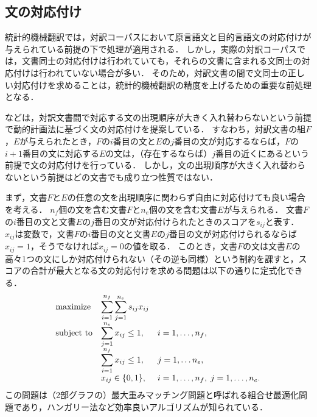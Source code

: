 \documentclass[japanese]{jnlp_1.4}
\begin{document}
\subsection{文の対応付け}
\label{sec:alighnment}

統計的機械翻訳では，対訳コーパスにおいて原言語文と目的言語文の対応付けが与えられている前提の下で処理が適用される．
しかし，実際の対訳コーパスでは，文書同士の対応付けは行われていても，それらの文書に含まれる文同士の対応付けは行われていない場合が多い．
そのため，対訳文書の間で文同士の正しい対応付けを求めることは，統計的機械翻訳の精度を上げるための重要な前処理となる．

\cite{MaX2006,MooreRC2002}などは，対訳文書間で対応する文の出現順序が大きく入れ替わらないという前提で動的計画法に基づく文の対応付けを提案している．
すなわち，対訳文書の組$F$，$E$が与えられたとき，$F$の$i$番目の文と$E$の$j$番目の文が対応するならば，$F$の$i+1$番目の文に対応する$E$の文は，（存在するならば）$j$番目の近くにあるという前提で文の対応付けを行っている．
しかし，文の出現順序が大きく入れ替わらないという前提はどの文書でも成り立つ性質ではない．

まず，文書$F$と$E$の任意の文を出現順序に関わらず自由に対応付けても良い場合を考える．
$n_f$個の文を含む文書$F$と$n_e$個の文を含む文書$E$が与えられる．
文書$F$の$i$番目の文と文書$E$の$j$番目の文が対応付けられたときのスコアを$s_{ij}$と表す．
$x_{ij}$は変数で，文書$F$の$i$番目の文と文書$E$の$j$番目の文が対応付けられるならば$x_{ij}=1$，そうでなければ$x_{ij}=0$の値を取る．
このとき，文書$F$の文は文書$E$の高々1つの文にしか対応付けられない（その逆も同様）という制約を課すと，スコアの合計が最大となる文の対応付けを求める問題は以下の通りに定式化できる．
\begin{equation}
\begin{array}{lll}
\textnormal{maximize} & \displaystyle\sum_{i=1}^{n_f} \sum_{j=1}^{n_e} s_{ij} x_{ij} & \\
\textnormal{subject to} & \displaystyle\sum_{j=1}^{n_e} x_{ij} \le 1, & i = 1, \dots, n_f,\\
 & \displaystyle\sum_{i=1}^{n_f} x_{ij} \le 1, & j = 1, \dots n_e,\\
 & x_{ij} \in \{ 0, 1 \}, & i = 1, \dots, n_f, \; j = 1, \dots, n_e.
\end{array}
\end{equation}
この問題は（2部グラフの）最大重みマッチング問題と呼ばれる組合せ最適化問題であり，ハンガリー法など効率良いアルゴリズムが知られている\cite{KorteB2012}．
\end{document}
